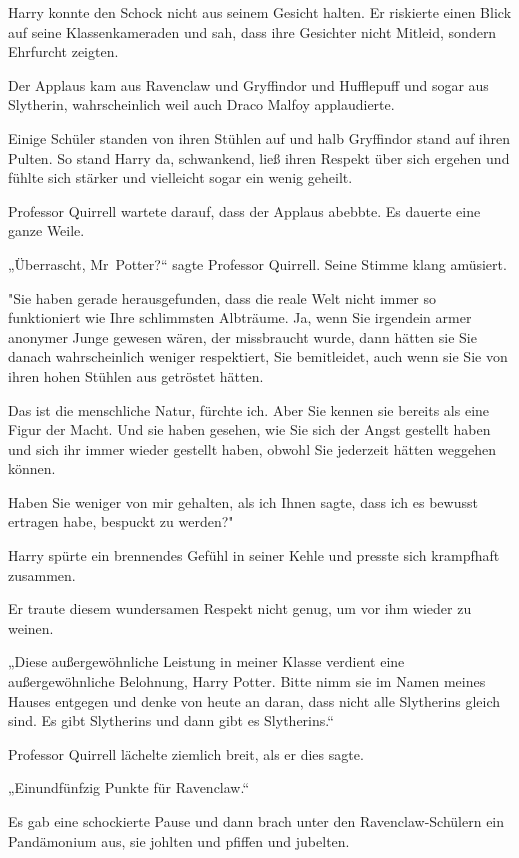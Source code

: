 {Harry konnte den Schock nicht aus seinem Gesicht halten. Er riskierte einen Blick auf seine Klassenkameraden und sah, dass ihre Gesichter nicht Mitleid, sondern Ehrfurcht zeigten.

Der Applaus kam aus Ravenclaw und Gryffindor und Hufflepuff und sogar aus Slytherin, wahrscheinlich weil auch Draco Malfoy applaudierte.

Einige Schüler standen von ihren Stühlen auf und halb Gryffindor stand auf ihren Pulten. So stand Harry da, schwankend, ließ ihren Respekt über sich ergehen und fühlte sich stärker und vielleicht sogar ein wenig geheilt.

Professor Quirrell wartete darauf, dass der Applaus abebbte. Es dauerte eine ganze Weile.

„Überrascht, Mr~Potter?“ sagte Professor Quirrell. Seine Stimme klang amüsiert.

"Sie haben gerade herausgefunden, dass die reale Welt nicht immer so funktioniert wie Ihre schlimmsten Albträume. Ja, wenn Sie irgendein armer anonymer Junge gewesen wären, der missbraucht wurde, dann hätten sie Sie danach wahrscheinlich weniger respektiert, Sie bemitleidet, auch wenn sie Sie von ihren hohen Stühlen aus getröstet hätten.

Das ist die menschliche Natur, fürchte ich. Aber Sie kennen sie bereits als eine Figur der Macht. Und sie haben gesehen, wie Sie sich der Angst gestellt haben und sich ihr immer wieder gestellt haben, obwohl Sie jederzeit hätten weggehen können.

Haben Sie weniger von mir gehalten, als ich Ihnen sagte, dass ich es bewusst ertragen habe, bespuckt zu werden?"

Harry spürte ein brennendes Gefühl in seiner Kehle und presste sich krampfhaft zusammen.

Er traute diesem wundersamen Respekt nicht genug, um vor ihm wieder zu weinen.

„Diese außergewöhnliche Leistung in meiner Klasse verdient eine außergewöhnliche Belohnung, Harry Potter. Bitte nimm sie im Namen meines Hauses entgegen und denke von heute an daran, dass nicht alle Slytherins gleich sind. Es gibt Slytherins und dann gibt es Slytherins.“

Professor Quirrell lächelte ziemlich breit, als er dies sagte.

„Einundfünfzig Punkte für Ravenclaw.“

Es gab eine schockierte Pause und dann brach unter den Ravenclaw-Schülern ein Pandämonium aus, sie johlten und pfiffen und jubelten.

}
